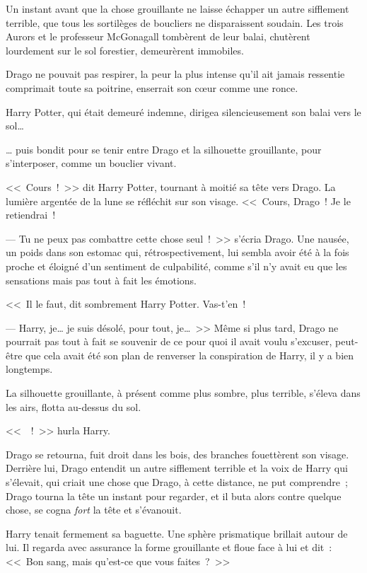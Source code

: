 \begin{em}
Un instant avant que la chose grouillante ne laisse échapper un autre sifflement terrible, que tous les sortilèges de boucliers ne disparaissent soudain. Les trois Aurors et le professeur McGonagall tombèrent de leur balai, chutèrent lourdement sur le sol forestier, demeurèrent immobiles.

Drago ne pouvait pas respirer, la peur la plus intense qu'il ait jamais ressentie comprimait toute sa poitrine, enserrait son cœur comme une ronce.

Harry Potter, qui était demeuré indemne, dirigea silencieusement son balai vers le sol…

… puis bondit pour se tenir entre Drago et la silhouette grouillante, pour s'interposer, comme un bouclier vivant.

<<~Cours~!~>> dit Harry Potter, tournant à moitié sa tête vers Drago. La lumière argentée de la lune se réfléchit sur son visage. <<~Cours, Drago~! Je le retiendrai~!

--- Tu ne peux pas combattre cette chose seul~!~>> s'écria Drago. Une nausée, un poids dans son estomac qui, rétrospectivement, lui sembla avoir été à la fois proche et éloigné d'un sentiment de culpabilité, comme s'il n'y avait eu que les sensations mais pas tout à fait les émotions.

<<~Il le faut, dit sombrement Harry Potter. Vas-t'en~!

--- Harry, je… je suis désolé, pour tout, je…~>> Même si plus tard, Drago ne pourrait pas tout à fait se souvenir de ce pour quoi il avait voulu s'excuser, peut-être que cela avait été son plan de renverser la conspiration de Harry, il y a bien longtemps.

La silhouette grouillante, à présent comme plus sombre, plus terrible, s'éleva dans les airs, flotta au-dessus du sol.

<<~~!~>> hurla Harry.

Drago se retourna, fuit droit dans les bois, des branches fouettèrent son visage. Derrière lui, Drago entendit un autre sifflement terrible et la voix de Harry qui s'élevait, qui criait une chose que Drago, à cette distance, ne put comprendre~; Drago tourna la tête un instant pour regarder, et il buta alors contre quelque chose, se cogna \emph{fort} la tête et s'évanouit.
\end{em}

\later

Harry tenait fermement sa baguette. Une sphère prismatique brillait autour de lui. Il regarda avec assurance la forme grouillante et floue face à lui et dit~: <<~Bon sang, mais qu'est-ce que vous faites~?~>>

